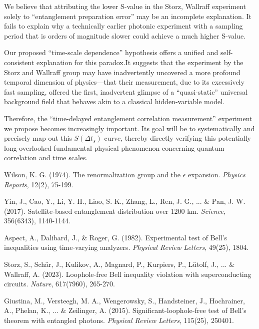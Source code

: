 \documentclass[11pt]{article}
\begin{document}
We believe that attributing the lower S-value in the Storz, Wallraff experiment solely to ``entanglement preparation error'' may be an incomplete explanation. It fails to explain why a technically earlier photonic experiment with a sampling period that is orders of magnitude slower could achieve a much higher S-value.

Our proposed ``time-scale dependence'' hypothesis offers a unified and self-consistent explanation for this paradox.It suggests that the experiment by the Storz and Wallraff group may have inadvertently uncovered a more profound temporal dimension of physics---that their measurement, due to its excessively fast sampling, offered the first, inadvertent glimpse of a ``quasi-static'' universal background field that behaves akin to a classical hidden-variable model.

Therefore, the ``time-delayed entanglement correlation measurement'' experiment we propose becomes increasingly important. Its goal will be to systematically and precisely map out this $S(\Delta t_s)$ curve, thereby directly verifying this potentially long-overlooked fundamental physical phenomenon concerning quantum correlation and time scales.




\newpage
\begin{thebibliography}{99}

Wilson, K. G. (1974). The renormalization group and the $\epsilon$ expansion. \textit{Physics Reports}, 12(2), 75-199.

Yin, J., Cao, Y., Li, Y. H., Liao, S. K., Zhang, L., Ren, J. G., ... \& Pan, J. W. (2017). Satellite-based entanglement distribution over 1200 km. \textit{Science}, 356(6343), 1140-1144.

Aspect, A., Dalibard, J., \& Roger, G. (1982). Experimental test of Bell's inequalities using time-varying analyzers. \textit{Physical Review Letters}, 49(25), 1804.

Storz, S., Schär, J., Kulikov, A., Magnard, P., Kurpiers, P., Lütolf, J., ... \& Wallraff, A. (2023). Loophole-free Bell inequality violation with superconducting circuits. \textit{Nature}, 617(7960), 265-270.

Giustina, M., Versteegh, M. A., Wengerowsky, S., Handsteiner, J., Hochrainer, A., Phelan, K., ... \& Zeilinger, A. (2015). Significant-loophole-free test of Bell's theorem with entangled photons. \textit{Physical Review Letters}, 115(25), 250401.

\end{thebibliography}
\end{document}
